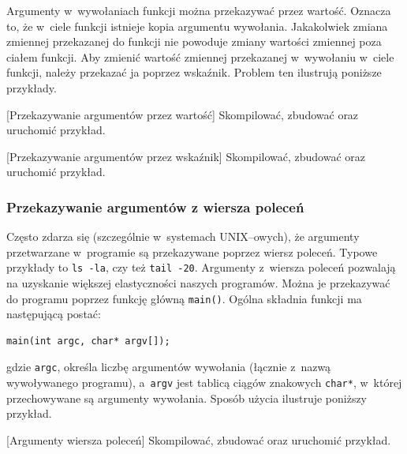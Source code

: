 Argumenty w~wywołaniach funkcji można przekazywać przez wartość. Oznacza to, że w~ciele funkcji istnieje kopia argumentu wywołania. Jakakolwiek zmiana zmiennej przekazanej do funkcji nie powoduje zmiany wartości zmiennej poza ciałem funkcji. Aby zmienić wartość zmiennej przekazanej w~wywołaniu w~ciele funkcji, należy przekazać ja poprzez wskaźnik. Problem ten ilustrują poniższe przykłady.

\begin{example}{[Przekazywanie argumentów przez wartość]} Skompilować, zbudować oraz uruchomić przykład. 

\end{example} 

\begin{example}{[Przekazywanie argumentów przez wskaźnik]} Skompilować, zbudować oraz uruchomić przykład. 

\end{example} 

\subsubsection{Przekazywanie argumentów z wiersza poleceń}

Często zdarza się (szczególnie w~systemach UNIX–owych), że argumenty przetwarzane w~programie są przekazywane poprzez wiersz poleceń. Typowe przykłady to \lstinline[style=MyCStyle]{ls -la}, czy też \lstinline[style=MyCStyle]{tail -20}. Argumenty z~wiersza poleceń pozwalają na uzyskanie większej elastyczności naszych programów. Można je przekazywać do programu poprzez funkcję główną \lstinline[style=MyCStyle]{main()}. Ogólna składnia funkcji ma następującą postać: 

\begin{lstlisting}[style=MyCStyle]
main(int argc, char* argv[]);
\end{lstlisting}

gdzie \lstinline[style=MyCStyle]{argc}, określa liczbę argumentów wywołania (łącznie z~nazwą wywoływanego programu), a~\lstinline[style=MyCStyle]{argv} jest tablicą ciągów znakowych \lstinline[style=MyCStyle]{char*}, w~której przechowywane są argumenty wywołania. Sposób użycia ilustruje poniższy przykład.

\begin{example}{[Argumenty wiersza poleceń]} Skompilować, zbudować oraz uruchomić przykład. 

\end{example}

